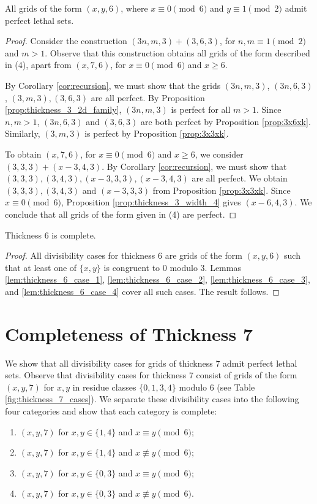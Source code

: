 \begin{lem}
\label{lem:thickness_6_case_4}
All grids of the form $(x,y,6)$, where $x \equiv 0 \pmod 6$ and $y \equiv 1 \pmod 2$ admit perfect lethal sets.
\end{lem}

\begin{proof}
Consider the construction $(3n,m,3) + (3,6,3)$, for $n,m \equiv 1 \pmod 2$ and $m > 1$. Observe that this construction obtains all grids of the form described in (4), apart from $(x,7,6)$, for $x \equiv 0 \pmod 6$ and $x \geq 6$. 

By Corollary \ref{cor:recursion}, we must show that the grids $(3n,m,3)$, $(3n,6,3)$, $(3,m,3), (3,6,3)$  are all perfect. By Proposition \ref{prop:thickness_3_2d_family}, $(3n,m,3)$ is perfect for all $m > 1$. Since $n,m > 1$, $(3n,6,3)$ and $(3,6,3)$ are both perfect by Proposition \ref{prop:3x6xk}. Similarly, $(3,m,3)$ is perfect by Proposition \ref{prop:3x3xk}.

To obtain $(x,7,6)$, for $x \equiv 0 \pmod 6$ and $x \geq 6$, we consider $(3,3,3) + (x-3, 4,3)$. By Corollary \ref{cor:recursion}, we must show that $(3,3,3), (3,4,3), (x-3,3,3), (x-3,4,3)$ are all perfect. We obtain $(3,3,3), (3,4,3)$ and $(x-3,3,3)$ from Proposition \ref{prop:3x3xk}. Since $x \equiv 0 \pmod 6$, Proposition \ref{prop:thickness_3_width_4} gives $(x-6,4,3)$. We conclude that all grids of the form given in (4) are perfect. 
\end{proof}

\begin{lem}
Thickness 6 is complete.
\end{lem}

\begin{proof}
All divisibility cases for thickness 6 are grids of the form $(x,y,6)$ such that at least one of $\{x,y\}$ is congruent to 0 modulo 3. Lemmas \ref{lem:thickness_6_case_1}, \ref{lem:thickness_6_case_2}, \ref{lem:thickness_6_case_3}, and \ref{lem:thickness_6_case_4} cover all such cases. The result follows.
\end{proof}

\section{Completeness of Thickness 7}

We show that all divisibility cases for grids of thickness 7 admit perfect lethal sets. Observe that divisibility cases for thickness 7 consist of grids of the form $(x,y,7)$ for $x,y$ in residue classes $\{0,1,3,4\}$ modulo 6 (see Table \ref{fig:thickness_7_cases}). We separate these divisibility cases into the following four categories and show that each category is complete:
\begin{enumerate}
\item $(x,y,7)$ for $x,y \in \{1,4\}$ and $x \equiv y \pmod 6$;
\item $(x,y,7)$ for $x,y \in \{1,4\}$ and $x \not\equiv y \pmod 6$;
\item $(x,y,7)$ for $x,y \in \{0,3\}$ and $x \equiv y \pmod 6$;
\item $(x,y,7)$ for $x,y \in \{0,3\}$ and $x \not\equiv y \pmod 6$.
\end{enumerate}

